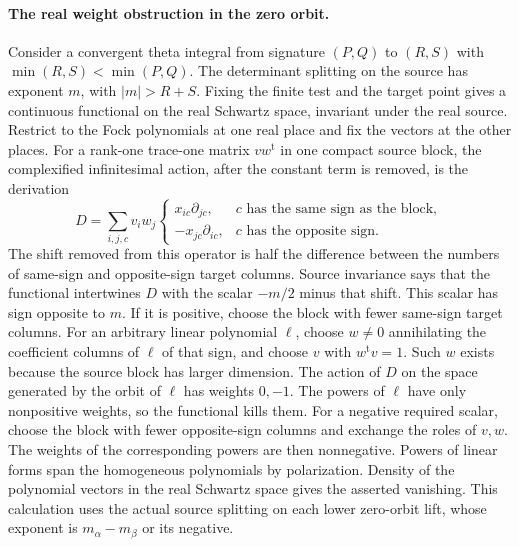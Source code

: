 \paragraph{The real weight obstruction in the zero orbit.}
Consider a convergent theta integral from signature \((P,Q)\) to
\((R,S)\) with \(\min(R,S)<\min(P,Q)\). The determinant splitting
on the source has exponent \(m\), with \(|m|>R+S\). Fixing the
finite test and the target point gives a continuous functional on the
real Schwartz space, invariant under the real source. Restrict to the
Fock polynomials at one real place and fix the vectors at the other
places. For a rank-one trace-one matrix \(v w^{\mathrm t}\) in one
compact source block, the complexified infinitesimal action, after
the constant term is removed, is the derivation
\[
 D=\sum_{i,j,c}v_i w_j
     \begin{cases}
       x_{ic}\partial_{jc}, & c\text{ has the same sign as the block},\\
       -x_{jc}\partial_{ic}, & c\text{ has the opposite sign}.
     \end{cases}
\]
The shift removed from this operator is half the difference between
the numbers of same-sign and opposite-sign target columns. Source
invariance says that the functional intertwines \(D\) with the
scalar \(-m/2\) minus that shift. This scalar has sign opposite to
\(m\). If it is positive, choose the block with fewer same-sign
target columns. For an arbitrary linear polynomial \(\ell\), choose
\(w\ne0\) annihilating the coefficient columns of \(\ell\) of
that sign, and choose \(v\) with \(w^{\mathrm t}v=1\). Such \(w\)
exists because the source block has larger dimension. The action of
\(D\) on the space generated by the orbit of \(\ell\) has weights
\(0,-1\). The powers of \(\ell\) have only nonpositive weights, so
the functional kills them. For a negative required scalar,
choose the block with fewer opposite-sign columns and exchange the
roles of \(v,w\). The weights of the corresponding powers are then
nonnegative. Powers of linear forms span the homogeneous polynomials
by polarization. Density of the polynomial vectors in the real
Schwartz space gives the asserted vanishing. This calculation uses
the actual source splitting on each lower zero-orbit lift, whose
exponent is \(m_\alpha-m_\beta\) or its negative.


